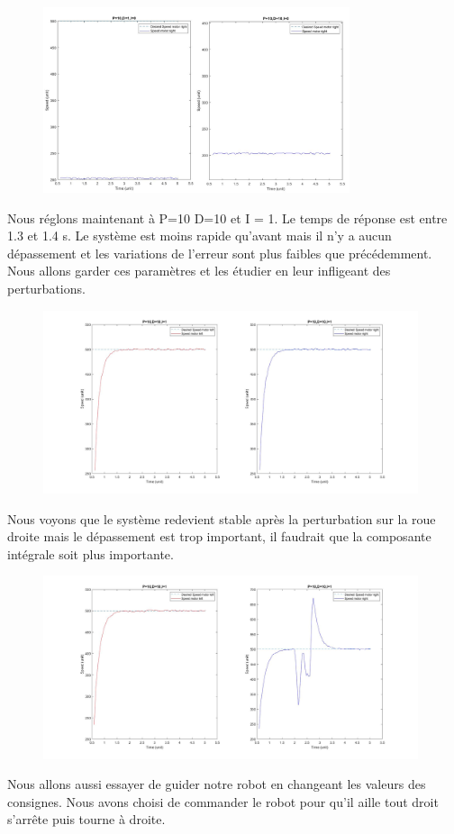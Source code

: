 \documentclass[a4paper]{article}
\begin{document}
		\begin{figure}[h]
			\centering
			\includegraphics[width = 9cm]{imgs/fig7.png}
			\caption{}
		\end{figure}
		Nous réglons maintenant à P=10 D=10 et I = 1. Le temps de réponse est entre 1.3 et 1.4 s. Le système est moins rapide qu’avant mais il n’y a aucun dépassement et les variations de l’erreur sont plus faibles que précédemment. Nous allons garder ces paramètres et les étudier en leur infligeant des perturbations.\\

		\begin{figure}[h]
			\centering
			\includegraphics[width = 11cm]{imgs/fig8.jpg}
			\caption{}
		\end{figure}
		Nous voyons que le système redevient stable après la perturbation sur la roue droite mais le dépassement est trop important, il faudrait que la composante intégrale soit plus importante.
		
		\begin{figure}[h]
			\centering
			\includegraphics[width = 11cm]{imgs/fig9.jpg}
			\caption{}
		\end{figure}
		Nous allons aussi essayer de guider notre robot en changeant les valeurs des consignes. Nous avons choisi de commander le robot pour qu’il aille tout droit s’arrête puis tourne à droite.
		\newpage
		
\end{document}
